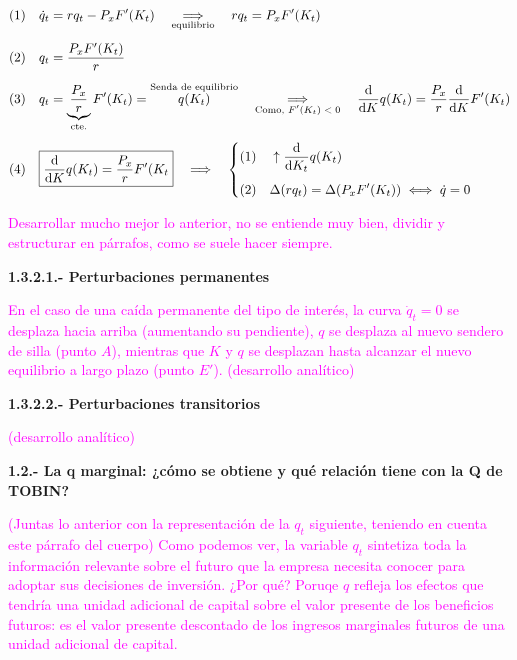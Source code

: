 \documentclass[10pt,a4paper]{article}
\begin{document}
$$\begin{aligned}
    &(1)\quad \dot q_t=rq_t-P_xF'(K_t)\quad\underset{\text{\scriptsize equilibrio}}{\Longrightarrow}\quad rq_t=P_xF'(K_t)\\[0.5em]
    &(2)\quad q_t=\frac{P_xF'(K_t)}{r}\\[0.5em]
    &(3)\quad q_t=\underbrace{\frac{P_x}{r}}_{\text{\scriptsize cte.}}F'(K_t)=\overset{\text{\scriptsize Senda de equilibrio}}{q(K_t)}\quad\underset{\text{\scriptsize Como, $F'(K_t)<0$}}{\Longrightarrow}\quad \frac{\mathrm d}{\mathrm dK}q(K_t)=\frac{P_x}{r}\frac{\mathrm d}{\mathrm dK}F'(K_t)\\[0.5em]
    &(4) \quad \boxed{\frac{\mathrm d}{\mathrm dK}q(K_t)=\frac{P_x}{r}F'(K_t}\quad\Longrightarrow\quad 
    \left\{\begin{aligned}
        &(1) &&\uparrow\frac{\mathrm d}{\mathrm dK_t}q(K_t)\\[0.5em]
        &(2) && \Delta (rq_t)=\Delta(P_xF'(K_t))\iff \dot q=0
  \end{aligned}\right.
\end{aligned}$$

\textcolor{magenta}{Desarrollar mucho mejor lo anterior, no se entiende muy bien, dividir y estructurar en párrafos, como se suele hacer siempre.}


\textbf{1.3.2.1.- Perturbaciones permanentes}

\textcolor{magenta}{En el caso de una caída permanente del tipo de interés, la curva $\dot q_t=0$ se desplaza hacia arriba (aumentando su pendiente), $q$ se desplaza al nuevo sendero de silla (punto $A$), mientras que $K$ y $q$ se desplazan hasta alcanzar el nuevo equilibrio a largo plazo (punto $E'$). (desarrollo analítico)}

\textbf{1.3.2.2.- Perturbaciones transitorios}

\textcolor{magenta}{(desarrollo analítico)}


\textbf{1.2.- La q marginal: ¿cómo se obtiene y qué relación tiene con la Q de TOBIN?}


\textcolor{magenta}{(Juntas lo anterior con la representación de la $q_t$ siguiente, teniendo en cuenta este párrafo del cuerpo) Como podemos ver, la variable $q_t$ sintetiza toda la información relevante sobre el futuro que la empresa necesita conocer para adoptar sus decisiones de inversión. ¿Por qué? Poruqe $q$ refleja los efectos que tendría una unidad adicional de capital sobre el valor presente de los beneficios futuros: es el valor presente descontado de los ingresos marginales futuros de una unidad adicional de capital.}
\end{document}
